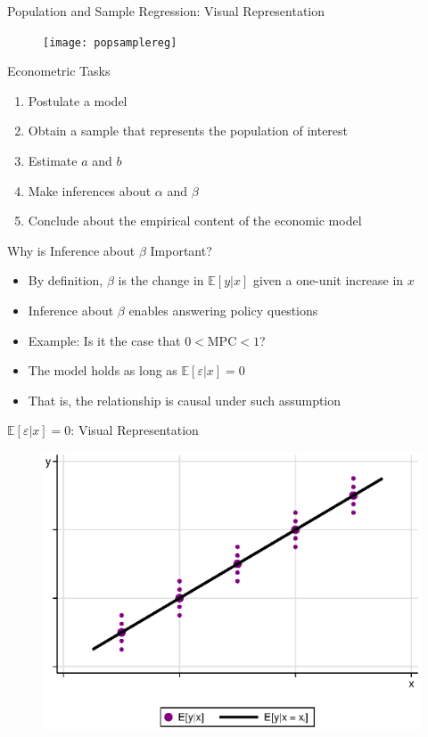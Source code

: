 \documentclass[static]{JJH-Beamer}
\begin{document}
\begin{frame}{Population and Sample Regression: Visual Representation}
\begin{figure}[H]
\centering
\texttt{[image: popsamplereg]}
\end{figure}
\end{frame}

\begin{frame}{Econometric Tasks}
	\begin{enumerate}
		\item Postulate a model 
		\bigskip
		\item Obtain a sample that represents the population of interest
		\bigskip
		\item Estimate $a$ and $b$
		\bigskip
		\item Make inferences about $\alpha$ and $\beta$
		\bigskip 
		\item Conclude about the empirical content of the economic model
	\end{enumerate}
\end{frame}

\begin{frame}{Why is Inference about $\beta$ Important?}
	\begin{itemize}
		\item By definition, $\beta$ is the change in $\mathbb{E}\left[ y | x \right]$ given a one-unit increase in $x$
		\bigskip
		\item Inference about $\beta$ enables answering policy questions
		\item Example: Is it the case that $0 < \text{MPC} < 1$? 
		\bigskip
		\item The model holds as long as $\mathbb{E}\left[\varepsilon | x \right] = 0$
		\item That is, the relationship is causal under such assumption
	\end{itemize}
\end{frame}


\begin{frame}{$\mathbb{E} \left[ \varepsilon | x \right] = 0$: Visual Representation}
\begin{figure}[H]
\centering
\includegraphics[width=.85\columnwidth]{conditionalexpected}
\end{figure}
\end{frame}
\end{document}
